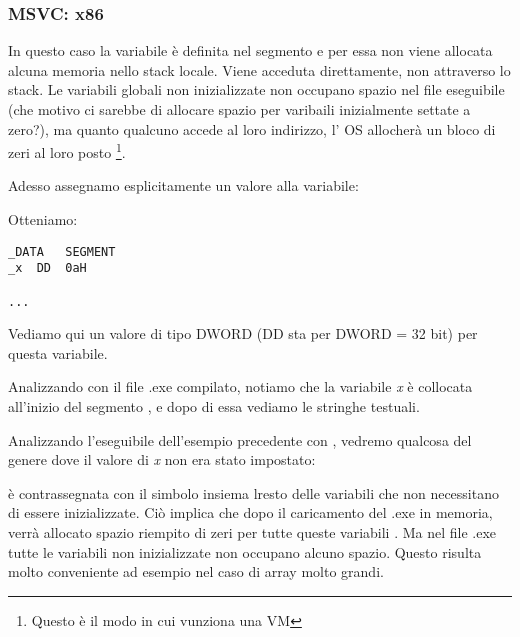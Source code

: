 \subsubsection{MSVC: x86}



In questo caso la variabile  è definita nel segmento  e per essa non viene allocata alcuna memoria nello stack locale. Viene acceduta direttamente, non attraverso lo stack.
Le variabili globali non inizializzate non occupano spazio nel file eseguibile 
(che motivo ci sarebbe di allocare spazio per varibaili inizialmente settate a zero?), 
ma quanto qualcuno accede al loro indirizzo, l' \ac{OS} allocherà un bloco di zeri al loro posto \footnote{Questo è il modo in cui vunziona una \ac{VM} }.

Adesso assegnamo esplicitamente un valore alla variabile:



Otteniamo:

\begin{lstlisting}[style=customasmx86]
_DATA	SEGMENT
_x	DD	0aH

...
\end{lstlisting}

Vediamo qui un valore  di tipo DWORD (DD sta per DWORD = 32 bit) per questa variabile.

Analizzando con \IDA il file .exe compilato, notiamo che la variabile \emph{x} è collocata all'inizio del segmento , e dopo di essa vediamo le stringhe testuali.

Analizzando l'eseguibile dell'esempio precedente con \IDA, vedremo qualcosa del genere dove il valore di \emph{x} non era stato impostato:



 è contrassegnata con il simbolo  insiema lresto delle variabili che non necessitano di essere inizializzate.
Ciò implica che dopo il caricamento del .exe in memoria, verrà allocato spazio riempito di zeri per tutte queste variabili .
Ma nel file .exe tutte le variabili non inizializzate non occupano alcuno spazio.
Questo risulta molto conveniente ad esempio nel caso di array molto grandi.



